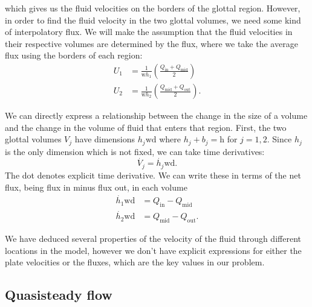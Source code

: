 which gives us the fluid velocities on the borders of the glottal region.
However, in order to find the fluid velocity in the two glottal volumes,
we need some kind of interpolatory flux. 
We will make the assumption that the fluid velocities in their respective volumes are determined by the flux, where we take the average flux using the borders of each region:
\begin{equation}
	\begin{aligned}
		U_1 &= \frac{1}{\mathrm{w}h_1}\left(\frac{Q_\mathrm{in} + Q_\mathrm{mid}}{2}\right) \\
		U_2 &= \frac{1}{\mathrm{w}h_2}\left(\frac{Q_\mathrm{mid} + Q_\mathrm{out}}{2}\right).
		\label{eqn:twomass_velocity_interpolation}
	\end{aligned}
\end{equation}

We can directly express a relationship between the change in the size of a volume and the change in the volume of fluid that enters that region.
First, the two glottal volumes $V_j$ have dimensions $h_j\mathrm{wd}$ where $h_j+b_j=\mathrm{h}$ for $j=1,2$. Since $h_j$ is the only dimension which is not fixed, we can take time derivatives:
\begin{equation}
	\dot{V_j} = \dot{h_j} \mathrm{wd}.
\end{equation}
The dot denotes explicit time derivative.
We can write these in terms of the net flux, being flux in minus flux out, in each volume
\begin{equation}
	\begin{aligned}
		\dot{h_1} \mathrm{w d} &= Q_\mathrm{in} - Q_\mathrm{mid} \\
		\dot{h_2} \mathrm{w d} &= Q_\mathrm{mid} - Q_\mathrm{out}.
	\end{aligned}
	\label{eqn:twomass_flux_motion}
\end{equation}

We have deduced several properties of the velocity of the fluid through different locations in the model,
however we don't have explicit expressions for either the plate velocities or the fluxes,
which are the key values in our problem.

\subsection{Quasisteady flow}

